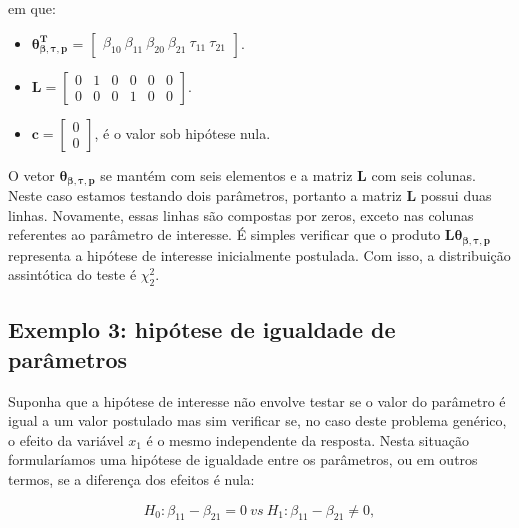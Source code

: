 \noindent em que:

\begin{itemize}
  
  \item $\boldsymbol{\theta_{\beta,\tau,p}^T}$ = $\begin{bmatrix} \beta_{10} \  \beta_{11} \ \beta_{20} \ \beta_{21} \ \tau_{11} \ \tau_{21} \end{bmatrix}$.


\item $\boldsymbol{L} = \begin{bmatrix} 0 & 1 & 0 & 0 & 0 & 0 \\
0 & 0 & 0 & 1 & 0 & 0 \end{bmatrix}.$
 
\item $\boldsymbol{c} = \begin{bmatrix} 0 \\ 0 \end{bmatrix}$, é o valor sob hipótese nula. 

\end{itemize}

O vetor $\boldsymbol{\theta_{\beta,\tau,p}}$ se mantém com seis elementos e a matriz $\boldsymbol{L}$ com seis colunas. Neste caso estamos testando dois parâmetros, portanto a matriz $\boldsymbol{L}$ possui duas linhas. Novamente, essas linhas são compostas por zeros, exceto nas colunas referentes ao parâmetro de interesse. É simples verificar que o produto $\boldsymbol{L}\boldsymbol{\theta_{\beta,\tau,p}}$ representa a hipótese de interesse inicialmente postulada. Com isso, a distribuição assintótica do teste é $\chi^2_2$.

\subsection{Exemplo 3: hipótese de igualdade de parâmetros}

Suponha que a hipótese de interesse não envolve testar se o valor do parâmetro é igual a um valor postulado mas sim verificar se, no caso deste problema genérico, o efeito da variável $x_1$ é o mesmo independente da resposta. Nesta situação formularíamos uma hipótese de igualdade entre os parâmetros, ou em outros termos, se a diferença dos efeitos é nula:

\begin{equation}
H_0: \beta_{11} - \beta_{21} = 0 \ vs \ H_1: \beta_{11} - \beta_{21} \neq 0,
\end{equation}

